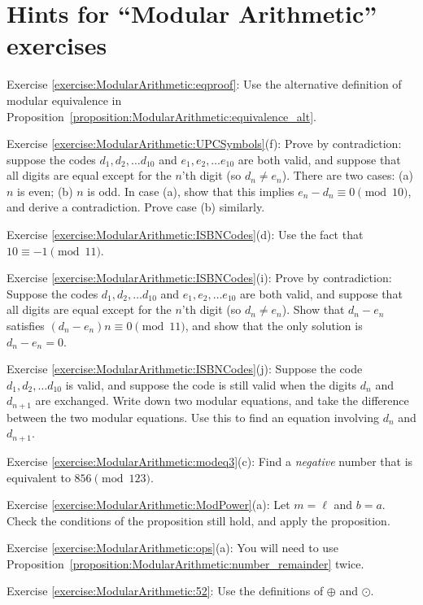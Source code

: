 \section{Hints for ``Modular Arithmetic'' exercises}
\label{sec:ModularArithmetic:Hints}


\noindent Exercise \ref{exercise:ModularArithmetic:eqproof}: Use the alternative definition of modular equivalence in Proposition~\ref{proposition:ModularArithmetic:equivalence_alt}.

\noindent Exercise \ref{exercise:ModularArithmetic:UPCSymbols}(f): Prove by contradiction: 
suppose the codes  $d_1, d_2, \ldots  d_{10}$  and $e_1, e_2, \ldots  e_{10}$ are both valid, and suppose that all digits are equal except for the $n$'th digit (so $d_n \neq e_n$).
There are two cases: (a) $n$ is even; (b) $n$ is odd. In case (a), show that this implies $e_n - d_n \equiv 0  \pmod{10}$, and derive a contradiction. Prove case (b) similarly.

\noindent Exercise \ref{exercise:ModularArithmetic:ISBNCodes}(d): Use the fact that $10 \equiv -1 \pmod{11}$.

\noindent Exercise \ref{exercise:ModularArithmetic:ISBNCodes}(i): Prove by contradiction: Suppose the codes  $d_1, d_2, \ldots  d_{10}$  and $e_1, e_2, \ldots  e_{10}$ are both valid, and suppose that all digits are equal except for the $n$'th digit (so $d_n \neq e_n$). Show that $d_n - e_n$ satisfies $(d_n - e_n)n \equiv 0 \pmod{11}$, and show that the only solution is $d_n - e_n = 0$.

\noindent Exercise \ref{exercise:ModularArithmetic:ISBNCodes}(j): Suppose the code $d_1, d_2, \ldots  d_{10}$  is valid, and suppose the code is still valid when the digits $d_n$ and $d_{n+1}$ are exchanged. Write down two modular equations, and take the difference between the two modular equations.  Use this to find an equation involving $d_n$ and $d_{n+1}$.

\noindent Exercise \ref{exercise:ModularArithmetic:modeq3}(c): Find a \emph{negative} number that is equivalent to $856 \pmod{123}$.

\noindent Exercise \ref{exercise:ModularArithmetic:ModPower}(a): Let $m=\ell$ and $b=a$. Check the conditions of the proposition still hold, and apply the proposition.

\noindent Exercise \ref{exercise:ModularArithmetic:ops}(a): You will need to use Proposition~\ref{proposition:ModularArithmetic:number_remainder} twice.

\noindent Exercise \ref{exercise:ModularArithmetic:52}: Use the definitions of $\oplus$ and $\odot$.

